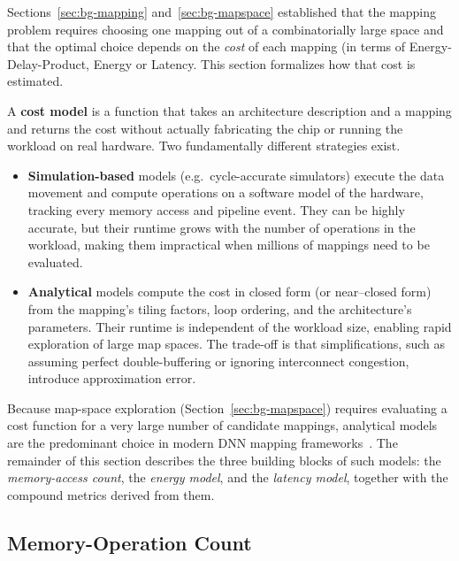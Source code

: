 Sections~\ref{sec:bg-mapping} and~\ref{sec:bg-mapspace} established that the
mapping problem requires choosing one mapping out of a combinatorially large
space and that the optimal choice depends on the \emph{cost} of each mapping (in terms of Energy-Delay-Product, Energy or Latency.
This section formalizes how that cost is estimated.

A \textbf{cost model} is a function that takes an architecture description and
a mapping and returns the cost without actually fabricating the chip or
running the workload on real hardware.
Two fundamentally different strategies exist.

\begin{itemize}
  \item \textbf{Simulation-based} models (e.g.\ cycle-accurate simulators)
        execute the data movement and compute operations on a software model of  the hardware, tracking every memory access and pipeline event.
        They can be highly accurate, but their runtime grows with the number
        of operations in the workload, making them impractical when millions
        of mappings need to be evaluated.
  \item \textbf{Analytical} models compute the cost in closed form (or
        near--closed form) from the mapping's tiling factors, loop ordering,
        and the architecture's parameters.
        Their runtime is independent of the workload size, enabling rapid
        exploration of large map spaces.
        The trade-off is that simplifications, such as assuming perfect
        double-buffering or ignoring interconnect congestion, introduce
        approximation error. 
\end{itemize}

Because map-space exploration (Section~\ref{sec:bg-mapspace}) requires
evaluating a cost function for a very large number of candidate mappings,
analytical models are the predominant choice in modern DNN mapping
frameworks~\cite{parashar2019timeloop, zigzag, kwon2019MAESTRO}.
The remainder of this section describes the three building blocks of such
models: the \emph{memory-access count}, the \emph{energy model}, and the
\emph{latency model}, together with the compound metrics derived from them.

\subsection{Memory-Operation Count}
\label{sec:mop-count}

